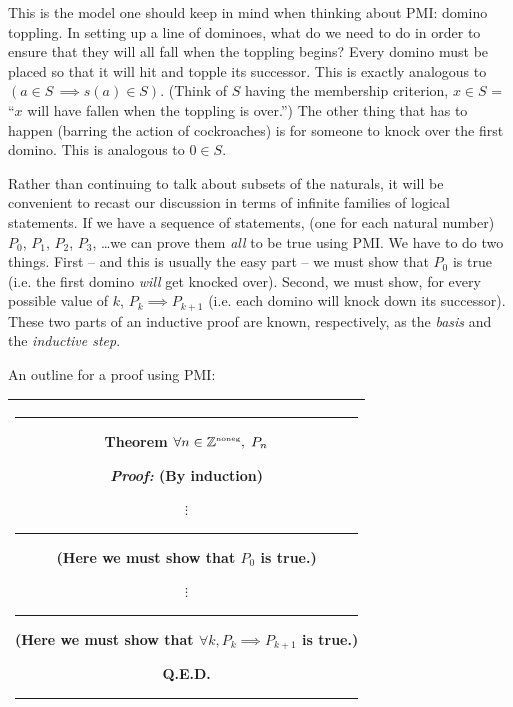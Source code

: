 This is the model one should keep in mind when thinking about PMI: domino
toppling.  In setting up a line of dominoes, what do we need to do
in order to ensure that they will all fall when the toppling begins?
Every domino must be placed so that it will hit and topple its successor.
This is exactly analogous to $(a \in S \, \implies s(a) \in S)$.  (Think 
of $S$ having the membership criterion, $x \in S$ = ``$x$ will have fallen
when the toppling is over.'')   The other thing that has to happen
(barring the action of cockroaches) is for someone to knock over the
first domino.  This is analogous to $0 \in S$.

Rather than continuing to talk about subsets of the naturals, it will
be convenient to recast our discussion in terms of infinite families
of logical statements.  If we have a sequence of statements, (one
for each natural number) $P_0$, $P_1$, $P_2$, $P_3$, \ldots  we
can prove them \emph{all} to be true using PMI.  We have to do two
things.   First -- and this is usually the easy part -- we must show 
that $P_0$ is true (i.e. the first domino \emph{will} get knocked over).
Second, we must show, for every possible value of $k$, $P_k \implies P_{k+1}$
(i.e. each domino will knock down its successor).  These two parts 
of an inductive proof are known, respectively, as the \emph{basis}
and the \emph{inductive step}. 

An outline for a proof using PMI:

\begin{center}
\begin{tabular}{|c|} \hline
\rule{16pt}{0pt}\begin{minipage}{.75\textwidth}

\rule{0pt}{16pt}{\bf \large Theorem} $ \displaystyle \forall n \in {\mathbb Z}^{\mbox{\tiny noneg}}, \; P_n $
\medskip

\rule{0pt}{20pt} {\em Proof:} (By induction)

\noindent {\bf Basis:}

\begin{center}
$\vdots$ \rule{36pt}{0pt} \begin{minipage}[c]{1.7 in} (Here we must show that $P_0$ is true.) \end{minipage}
\end{center}

\noindent {\bf Inductive step:}

\begin{center}
$\vdots$ \rule{36pt}{0pt} \begin{minipage}[c]{1.7 in} (Here we must show that $\forall k,  P_k \implies P_{k+1}$ is true.) \end{minipage}
\end{center}

\rule{0pt}{0pt} \hspace{\fill} Q.E.D. \rule[-10pt]{0pt}{16pt}
\end{minipage} \rule{16pt}{0pt} \\ \hline
\end{tabular}
\end{center}
\medskip

